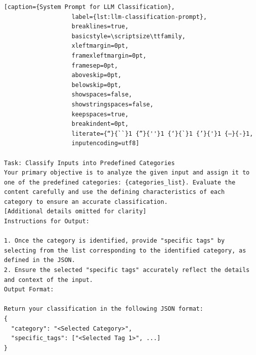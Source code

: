 \documentclass[conference]{IEEEtran}
\begin{document}
\vspace{2.0\baselineskip}
\begin{lstlisting}[caption={System Prompt for LLM Classification}, 
                   label={lst:llm-classification-prompt}, 
                   breaklines=true, 
                   basicstyle=\scriptsize\ttfamily, 
                   xleftmargin=0pt, 
                   framexleftmargin=0pt, 
                   framesep=0pt, 
                   aboveskip=0pt, 
                   belowskip=0pt, 
                   showspaces=false, 
                   showstringspaces=false,
                   keepspaces=true,
                   breakindent=0pt,
                   literate={“}{``}1 {”}{''}1 {‘}{`}1 {’}{'}1 {–}{-}1,
                   inputencoding=utf8]

Task: Classify Inputs into Predefined Categories
Your primary objective is to analyze the given input and assign it to one of the predefined categories: {categories_list}. Evaluate the content carefully and use the defining characteristics of each category to ensure an accurate classification.
[Additional details omitted for clarity]
Instructions for Output:

1. Once the category is identified, provide "specific tags" by selecting from the list corresponding to the identified category, as defined in the JSON.
2. Ensure the selected "specific tags" accurately reflect the details and context of the input.
Output Format:

Return your classification in the following JSON format:
{
  "category": "<Selected Category>",
  "specific_tags": ["<Selected Tag 1>", ...]
}
\end{lstlisting}




\end{document}
